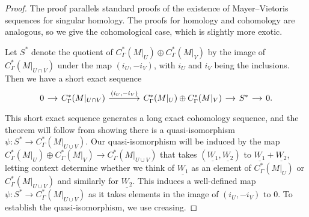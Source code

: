\begin{proof}
	The proof parallels standard proofs of the existence of Mayer--Vietoris sequences for singular homology.
	The proofs for homology and cohomology are analogous, so we give the cohomological case, which is slightly more exotic.

	Let $S^*$ denote the quotient of $C_{\Gamma}^*(M|_U) \oplus C_{\Gamma}^{*}(M|_V)$ by the image of $C_{\Gamma}^*(M|_{U \cap V})$ under the map $(i_U, -i_V)$, with $i_U$ and $i_V$ being the inclusions.
	Then we have a short exact sequence
	\begin{equation}\label{E: homology MV SES}
		\begin{tikzcd}[
			column sep = small,
			arrow style = math font,
			cells = {nodes = {text height = 2ex,text depth = 0.75ex}}
			]
			0 \arrow[r] &
			C_{\Gamma}^{*}(M|_{U \cap V}) \arrow[r, "(i_U{,}-i_V)"] &[25pt]
			C_{\Gamma}^*(M|_U) \oplus C_{\Gamma}^{*}(M|_V) \arrow[r] &
			S^* \arrow[r] &
			0.
		\end{tikzcd}
	\end{equation}
	This short exact sequence generates a long exact cohomology sequence, and the theorem will follow from showing there is a quasi-isomorphism $\psi \colon S^* \to C_{\Gamma}^*(M|_{U \cup V})$.
	Our quasi-isomorphism will be induced by the map $C_{\Gamma}^*(M|_U) \oplus C_{\Gamma}^{*}(M|_V) \to C_{\Gamma}^*(M|_{U \cup V})$ that takes $(\underline{W_1},  \underline{W_2})$ to $\underline{W_1}+\underline{W_2}$, letting context determine whether we think of $\underline{W_1}$ as an element of $C_{\Gamma}^*(M|_U)$ or $C_{\Gamma}^*(M|_{U \cup V})$ and similarly for $\underline{W_2}$.
	This induces a well-defined map $\psi \colon S^* \to C_{\Gamma}^*(M|_{U \cup V})$ as it takes elements in the image of $(i_U,-i_V)$ to $0$.
	To establish the quasi-isomorphism, we use creasing.


\end{proof}
